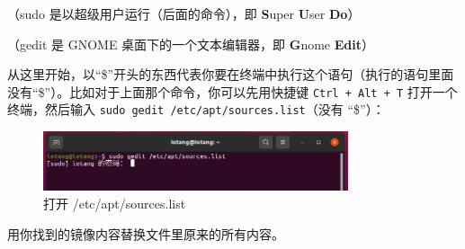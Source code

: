 \documentclass[UTF-8]{ctexart}
\begin{document}
				（sudo 是以超级用户运行（后面的命令），即 \textbf{S}uper \textbf{U}ser \textbf{Do}）
			
				（gedit 是 GNOME 桌面下的一个文本编辑器，即 \textbf{G}nome \textbf{Edit}）
				
				从这里开始，以“\$”开头的东西代表你要在终端中执行这个语句（执行的语句里面没有“\$”）。比如对于上面那个命令，你可以先用快捷键 \texttt{Ctrl + Alt + T} 打开一个终端，然后输入 \texttt{sudo gedit /etc/apt/sources.list}（没有 “\$”）：
	
				\begin{figure}[H]
					\centering
					\includegraphics[width=0.8\textwidth]{fig/gedit_etcaptsourceslist.png}
					\caption*{打开 /etc/apt/sources.list}
				\end{figure}
				
				用你找到的镜像内容替换文件里原来的所有内容。
				
\end{document}

